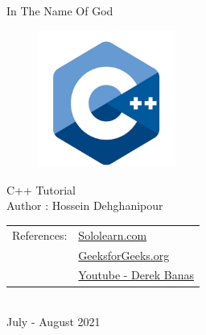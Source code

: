 \documentclass[12pt , a4paper]{article}
\begin{document}
%
%
\thispagestyle{empty}
 \begin{center}

{
\centering
{}  
\fontsize{16pt}{16pt}
\selectfont 
In The Name Of God
}
\\[60pt]
\begin{figure}[H]
\centering
\includegraphics[width=0.4\textwidth]{c-logo-icon-.png}
\caption*{}
\label{f-0-0}
\end{figure}
{
\centering
{}  
\fontsize{14pt}{14pt}
\selectfont 
C++ Tutorial
}
\\[20pt]
{
\centering
{}  
\fontsize{12pt}{12pt}
\selectfont 
Author : Hossein Dehghanipour
}
\\[20pt]
{
\centering
{}  
\fontsize{12pt}{12pt}
\selectfont 
\begin{tabular}{l | l}
References:	&	 \href{www.sololearn.com}{Sololearn.com}\\ [5pt]
				&	 \href{https://www.geeksforgeeks.org/}{GeeksforGeeks.org}\\[5pt]
				&	 \href{https://www.youtube.com/watch?v=DamuE8TM3xo&list=PLGLfVvz_LVvQ9S8YSV0iDsuEU8v11yP9M}{Youtube - Derek Banas}
\end{tabular}
}
\\[20pt]
{
\centering
{}  
\fontsize{12pt}{12pt}
\selectfont 
July - August 2021
}

\end{center}
 

 
\setmainfont{Times New Roman}
\newpage

%
%
\tableofcontents
\newpage
\end{document}
